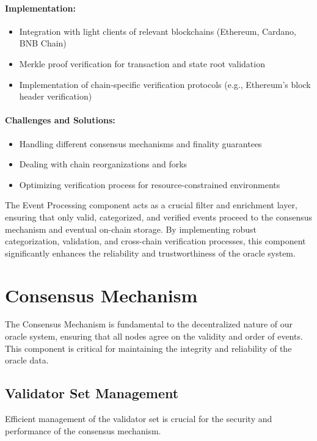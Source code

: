 \documentclass[12pt,a4paper]{article}
\begin{document}
	\paragraph{Implementation:}
	\begin{itemize}
		\item Integration with light clients of relevant blockchains (Ethereum, Cardano, BNB Chain)
		\item Merkle proof verification for transaction and state root validation
		\item Implementation of chain-specific verification protocols (e.g., Ethereum's block header verification)
	\end{itemize}
	
	\paragraph{Challenges and Solutions:}
	\begin{itemize}
		\item Handling different consensus mechanisms and finality guarantees
		\item Dealing with chain reorganizations and forks
		\item Optimizing verification process for resource-constrained environments
	\end{itemize}
	
	The Event Processing component acts as a crucial filter and enrichment layer, ensuring that only valid, categorized, and verified events proceed to the consensus mechanism and eventual on-chain storage. By implementing robust categorization, validation, and cross-chain verification processes, this component significantly enhances the reliability and trustworthiness of the oracle system.
	
	\section{Consensus Mechanism}
	The Consensus Mechanism is fundamental to the decentralized nature of our oracle system, ensuring that all nodes agree on the validity and order of events. This component is critical for maintaining the integrity and reliability of the oracle data.
	
	\subsection{Validator Set Management}
	Efficient management of the validator set is crucial for the security and performance of the consensus mechanism.
	
\end{document}

